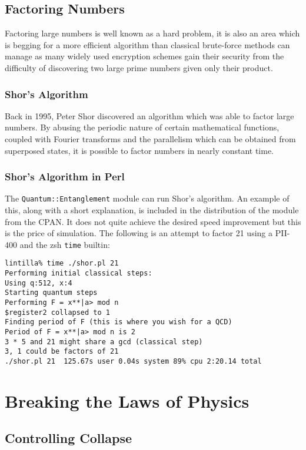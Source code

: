 \documentclass{article}      %
\newcommand{\ptt}[1]{\texttt{#1}}    %
\begin{document}
\subsection{Factoring Numbers}

Factoring large numbers is well known as a hard problem, it is also an
area which is begging for a more efficient algorithm than classical
brute-force methods can manage as many widely used encryption schemes
gain their security from the difficulty of discovering two
large prime numbers given only their product.

\subsubsection{Shor's Algorithm}

Back in 1995, Peter Shor discovered an algorithm which was able to
factor large numbers.  By abusing the periodic nature of certain
mathematical functions, coupled with Fourier transforms and the parallelism
which can be obtained from superposed states, it is possible to factor
numbers in nearly constant time.

\subsubsection{Shor's Algorithm in Perl}

\label{sect:shor}

The \ptt{Quantum::Entanglement} module can run Shor's algorithm.  An
example of this, along with a short explanation, is included in the
distribution of the module from the CPAN.  It does not
quite achieve the desired speed improvement but this is
the price of simulation.  The following is an attempt to factor 21
using a PII-400 and the zsh \ptt{time} builtin:
\begin{verbatim}
lintilla% time ./shor.pl 21 
Performing initial classical steps:
Using q:512, x:4
Starting quantum steps
Performing F = x**|a> mod n
$register2 collapsed to 1
Finding period of F (this is where you wish for a QCD)
Period of F = x**|a> mod n is 2
3 * 5 and 21 might share a gcd (classical step)
3, 1 could be factors of 21
./shor.pl 21  125.67s user 0.04s system 89% cpu 2:20.14 total
\end{verbatim} %

\section{Breaking the Laws of Physics}
\subsection{Controlling Collapse}
\end{document}
